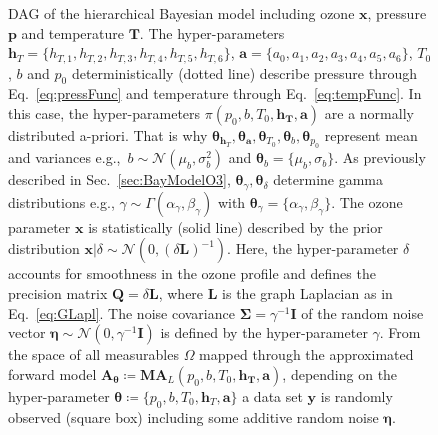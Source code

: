 \begin{figure}[thb!]
	\caption[Directed acyclic graph of Bayesian model for ozone $\bm{x}$, pressure $\bm{p}$ and temperature $\bm{T}$.]{DAG of the hierarchical Bayesian model including ozone $\bm{x}$, pressure $\bm{p}$ and temperature $\bm{T}$. The hyper-parameters $\bm{h}_T= \{ h_{T,1}, h_{T,2},h_{T,3},h_{T,4},h_{T,5},h_{T,6}\}$, $\bm{a} = \{ a_0, a_1, a_2,a_3,a_4,a_5,a_6\}$, $T_0$, $b$ and $p_0$ deterministically (dotted line) describe pressure through Eq.~\ref{eq:pressFunc} and temperature through Eq.~\ref{eq:tempFunc}. In this case, the hyper-parameters $\pi(p_0,b,T_0,\bm{h_T},\bm{a})$ are a normally distributed a-priori. That is why $\bm{\theta}_{\bm{h}_T},\bm{\theta}_{\bm{a}}, \bm{\theta}_{T_{0}},\bm{\theta}_{b} , \bm{\theta}_{p_0}$ represent mean and variances e.g.,~$b \sim \mathcal{N}(\mu_b, \sigma^2_b)$ and $\bm{\theta}_{b} = \{\mu_b, \sigma_b\}$.
	 As previously described in Sec.~\ref{sec:BayModelO3}, $\bm{\theta}_{\gamma}, \bm{\theta}_{\delta}$ determine gamma distributions e.g., $\gamma \sim \Gamma(\alpha_{\gamma},\beta_{\gamma}) $ with $\bm{\theta}_{\gamma} = 	\{\alpha_{\gamma},\beta_{\gamma} \}$.
	The ozone parameter $\bm{x}$ is statistically (solid line) described by the prior distribution $\bm{x}| \delta \sim \mathcal{N}(0,(\delta \bm{L})^{-1}) $. 
	Here, the hyper-parameter $\delta$ accounts for smoothness in the ozone profile and defines the precision matrix $\bm{Q} = \delta \bm{L}$, where $\bm{L}$ is the graph Laplacian as in Eq.~\ref{eq:GLapl}.
	The noise covariance $\bm{\Sigma} = \gamma^{-1} \bm{I}$ of the random noise vector $\bm{\eta} \sim \mathcal{N}(0,\gamma^{-1} \bm{I} ) $ is defined by the hyper-parameter $\gamma$.
	From the space of all measurables $\Omega$ mapped through the approximated forward model $\bm{A}_{\bm{\theta}} \coloneqq \bm{M}\bm{A}_L(p_0,b,T_0,\bm{h_T},\bm{a})$, depending on the hyper-parameter $\bm{\theta}  \coloneqq \{p_0, b, T_0,\bm{h}_T,\bm{a} \}$ a data set $\bm{y}$ is randomly observed (square box) including some additive random noise $\bm{\eta}$.}
	\label{fig:DAGComplete}
\end{figure}
